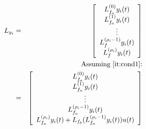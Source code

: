 \documentclass[letterpaper, 10 pt, conference]{ieeeconf}  %
\begin{document}




\begin{eqnarray*}
L_{y_i} &=& \left[\begin{array}{c}
L_{f_a}^{(0)}y_i(t)\\
L_{f_a}^{(1)}y_i(t)\\
\vdots\\
L^{({\rho_i}-1)}_fy_i(t)\\
L^{({\rho_i})}_fy_i(t)
\end{array}\right]\\
&&\text{Assuming \ref{it:cond1}:}\\
&=& \left[\begin{array}{c}
L_{f_a}^{(0)}y_i(t)\\
L_{f_a}^{(1)}y_i(t)\\
\vdots\\
L^{({\rho_i}-1)}_{f_a}y_i(t)\\
L^{({\rho_i})}_{f_a}y_i(t)+L_{f_{b}}(L_{f_a}^{({\rho_i}-1)}y_i(t))u(t)
\end{array}\right]
\end{eqnarray*}
\end{document}
